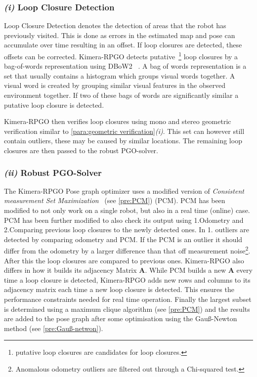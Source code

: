 \documentclass[11pt,a4paper]{article}
\newcommand{\M}[1]{\mathbf{#1}}
\begin{document}
\subsubsection*{\textit{(i)} Loop Closure Detection}
Loop Closure Detection denotes the detection of areas that the robot has previously visited.
This is done as errors in the estimated map and pose can accumulate over time resulting in an offset.
If loop closures are detected, these offsets can be corrected. 
Kimera-RPGO detects putative~\footnote{putative loop closures are candidates for loop closures.} loop closures by a bag-of-words representation using DBoW2~\cite{dbow2} . 
A bag of words representation is a set that usually contains a histogram which groups visual words together. 
A visual word is created by grouping similar visual features in the observed environment together.
If two of these bags of words are significantly similar a putative loop closure is detected. 

Kimera-RPGO then verifies loop closures using mono and stereo geometric verification similar to \ref{para:geometric verification}\textit{(i)}. This set can however still contain outliers, these may be caused by similar locations.
The remaining loop closures are then passed to the robust PGO-solver.

\subsubsection*{\textit{(ii)} Robust PGO-Solver} 
The Kimera-RPGO Pose graph optimizer uses a modified version of \textit{Consistent measurement Set Maximization}~\cite{PCM} (see \ref{pre:PCM}) (PCM). PCM has been modified to not only work on a single robot, but also in a real time (online) case.
PCM has been further modified to also check its output using 1.Odometry and 2.Comparing previous loop closures to the newly detected ones. 
In 1. outliers are detected by comparing odometry and PCM. 
If the PCM is an outlier it should differ from the odometry by a larger difference than that off measurement noise\footnote{Anomalous odometry outliers are filtered out through a Chi-squared test.}. After this the loop closures are compared to previous ones. 
Kimera-RPGO also differs in how it builds its adjacency Matrix $\M{A}$.
While PCM builds a new $\M{A}$ every time a loop closure is detected, Kimera-RPGO adds new rows and columns to its adjacency matrix each time a new loop closure is detected. This ensures the performance constraints needed for real time operation.
Finally the largest subset is determined using a maximum clique algorithm (see \ref{pre:PCM}) and the results are added to the pose graph after some optimisation using the Gauß-Newton method (see \ref{pre:Gauß-netwon}).
\end{document}
